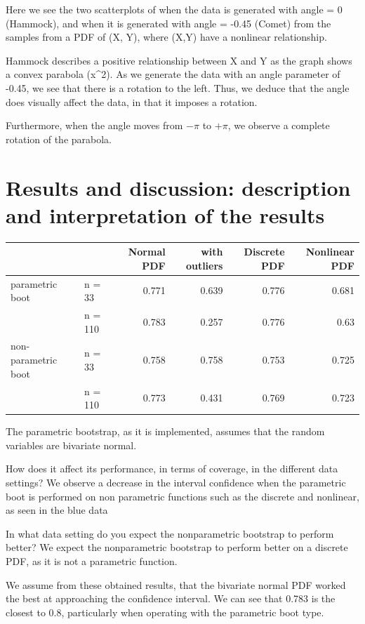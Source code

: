 \documentclass[11pt,]{article}
\begin{document}
Here we see the two scatterplots of when the data is generated with
angle = 0 (Hammock), and when it is generated with angle = -0.45 (Comet)
from the samples from a PDF of (X, Y), where (X,Y) have a nonlinear
relationship.

Hammock describes a positive relationship between X and Y as the graph
shows a convex parabola (x\^{}2). As we generate the data with an angle
parameter of -0.45, we see that there is a rotation to the left. Thus,
we deduce that the angle does visually affect the data, in that it
imposes a rotation.

Furthermore, when the angle moves from \(-\pi\) to \(+\pi\), we observe
a complete rotation of the parabola.

\hypertarget{results-and-discussion-description-and-interpretation-of-the-results}{%
\section{Results and discussion: description and interpretation of the
results}\label{results-and-discussion-description-and-interpretation-of-the-results}}

\begin{longtable}[]{@{}llrrrr@{}}
\toprule
& & Normal PDF & with outliers & Discrete PDF & Nonlinear
PDF\tabularnewline
\midrule
\endhead
parametric boot & n = 33 & 0.771 & 0.639 & 0.776 & 0.681\tabularnewline
& n = 110 & 0.783 & 0.257 & 0.776 & 0.63\tabularnewline
non-parametric boot & n = 33 & 0.758 & 0.758 & 0.753 &
0.725\tabularnewline
& n = 110 & 0.773 & 0.431 & 0.769 & 0.723\tabularnewline
\bottomrule
\end{longtable}

The parametric bootstrap, as it is implemented, assumes that the random
variables are bivariate normal.

How does it affect its performance, in terms of coverage, in the
different data settings? We observe a decrease in the interval
confidence when the parametric boot is performed on non parametric
functions such as the discrete and nonlinear, as seen in the blue data

In what data setting do you expect the nonparametric bootstrap to
perform better? We expect the nonparametric bootstrap to perform better
on a discrete PDF, as it is not a parametric function.

We assume from these obtained results, that the bivariate normal PDF
worked the best at approaching the confidence interval. We can see that
0.783 is the closest to 0.8, particularly when operating with the
parametric boot type.
\end{document}
